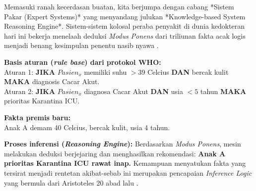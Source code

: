 Memasuki ranah kecerdasan buatan, kita berjumpa dengan cabang *Sistem Pakar (Expert Systems)* yang menyandang julukan *Knowledge-based System Reasoning Engine*. Sistem-sistem kolosal peraba penyakit di dunia kedokteran hari ini bekerja menelaah deduksi \textit{Modus Ponens} dari triliunan fakta acak logis menjadi benang kesimpulan penentu nasib nyawa \cite{mit_6042,saylor_cs202}.

\begin{contoh}

\textbf{Basis aturan (\textit{rule base}) dari protokol WHO:}\\
Aturan 1: \textbf{JIKA} $Pasien_{x}$ memiliki suhu $> 39$ Celcius \textbf{DAN} bercak kulit \textbf{MAKA} diagnosis Cacar Akut.\\
Aturan 2: \textbf{JIKA} $Pasien_{x}$ diagnosa Cacar Akut \textbf{DAN} usia $< 5$ tahun \textbf{MAKA} prioritas Karantina ICU.

\textbf{Fakta premis baru:} \\
Anak A demam 40 Celcius, bercak kulit, usia 4 tahun.

\textbf{Proses inferensi (\textit{Reasoning Engine}):} 
Berdasarkan \textit{Modus Ponens}, mesin melakukan deduksi berjejaring dan menghasilkan rekomendasi: \textbf{Anak A prioritas Karantina ICU rawat inap.} 
Kemampuan menyatukan fakta yang tersirat menjadi rentetan akibat-sebab ini merupakan pencapaian \textit{Inference Logic} yang bermula dari Aristoteles 20 abad lalu \cite{stanford_cs103}.
\end{contoh}
